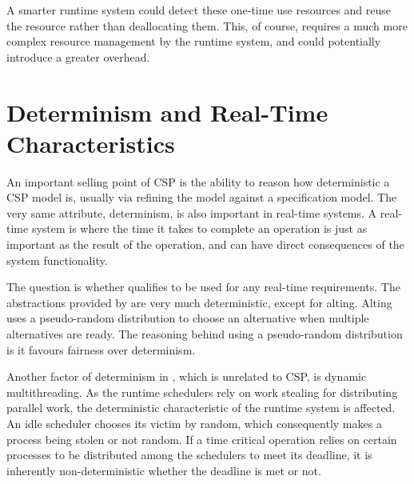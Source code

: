 A smarter runtime system could detect these one\hyp{}time use resources and reuse the resource rather than deallocating them. This, of course, requires a much more complex resource management by the runtime system, and could potentially introduce a greater overhead.


\section{Determinism and Real\hyp{}Time Characteristics}


An important selling point of CSP is the ability to reason how deterministic a CSP model is, usually via refining the model against a specification model. The very same attribute, determinism, is also important in real\hyp{}time systems. A real\hyp{}time system is where the time it takes to complete an operation is just as important as the result of the operation, and can have direct consequences of the system functionality.

The question is whether \Proxc{} qualifies to be used for any real\hyp{}time requirements. The abstractions provided by \Proxc{} are very much deterministic, except for alting. Alting uses a pseudo\hyp{}random distribution to choose an alternative when multiple alternatives are ready. The reasoning behind using a pseudo\hyp{}random distribution is it favours fairness over determinism.

Another factor of determinism in \Proxc{}, which is unrelated to CSP, is dynamic multithreading. As the runtime schedulers rely on work stealing for distributing parallel work, the deterministic characteristic of the runtime system is affected. An idle scheduler chooses its victim by random, which consequently makes a process being stolen or not random. If a time critical operation relies on certain processes to be distributed among the schedulers to meet its deadline, it is inherently non\hyp{}deterministic whether the deadline is met or not.

